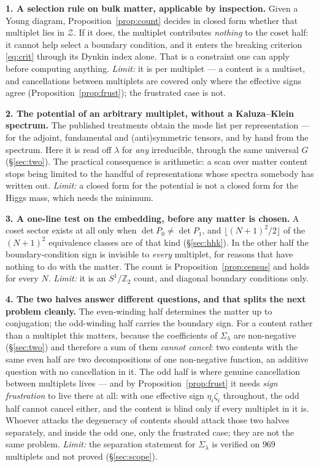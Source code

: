 \documentclass[11pt,a4paper]{article}
\newcommand{\ZZ}{\mathbb{Z}}
\newcommand{\Sig}{\Sigma_\lambda}
\begin{document}
\textbf{1. A selection rule on bulk matter, applicable by inspection.} Given a Young diagram,
Proposition~\ref{prop:count} decides in closed form whether that multiplet lies in $\mathcal Z$. If
it does, the multiplet contributes \emph{nothing} to the coset half: it cannot help select a boundary
condition, and it enters the breaking criterion \eqref{eq:crit} through its Dynkin index alone. That
is a constraint one can apply before computing anything. \emph{Limit:} it is per multiplet --- a
content is a multiset, and cancellations between multiplets are covered only where the effective
signs agree (Proposition~\ref{prop:frust}); the frustrated case is not.

\textbf{2. The potential of an arbitrary multiplet, without a Kaluza--Klein spectrum.} The
published treatments obtain the mode list per representation --- \cite{HY} for the adjoint,
fundamental and (anti)symmetric tensors, \cite{AHMN} and \cite{KKKY} by hand from the spectrum. Here
it is read off $\lambda$ for \emph{any} irreducible, through the same universal $G$
(\S\ref{sec:two}). The practical consequence is arithmetic: a scan over matter content stops being
limited to the handful of representations whose spectra somebody has written out. \emph{Limit:} a
closed form for the potential is not a closed form for the Higgs mass, which needs the minimum.

\textbf{3. A one-line test on the embedding, before any matter is chosen.} A coset sector exists at
all only when $\det P_0\neq\det P_1$, and $\lfloor(N+1)^2/2\rfloor$ of the $(N+1)^2$ equivalence
classes are of that kind (\S\ref{sec:hhk}). In the other half the boundary-condition sign is
invisible to \emph{every} multiplet, for reasons that have nothing to do with the matter. The count
is Proposition~\ref{prop:census} and holds for every $N$. \emph{Limit:} it is an $S^1/\ZZ_2$ count,
and diagonal boundary conditions only.

\textbf{4. The two halves answer different questions, and that splits the next problem cleanly.} The
even-winding half determines the matter up to conjugation; the odd-winding half carries the boundary
sign. For a content rather than a multiplet this matters, because the coefficients of $\Sig$ are
non-negative (\S\ref{sec:two}) and therefore a sum of them \emph{cannot cancel}: two contents with
the same even half are two decompositions of one non-negative function, an additive question with no
cancellation in it. The odd half is where genuine cancellation between multiplets lives --- and by
Proposition~\ref{prop:frust} it needs \emph{sign frustration} to live there at all: with one
effective sign $\eta_i\zeta_i$ throughout, the odd half cannot cancel either, and the content is
blind only if every multiplet in it is. Whoever attacks the degeneracy of contents should attack
those two halves separately, and inside the odd one, only the frustrated case; they are not the same
problem. \emph{Limit:} the separation statement for $\Sig$ is verified on $969$ multiplets and not
proved (\S\ref{sec:scope}).
\end{document}
